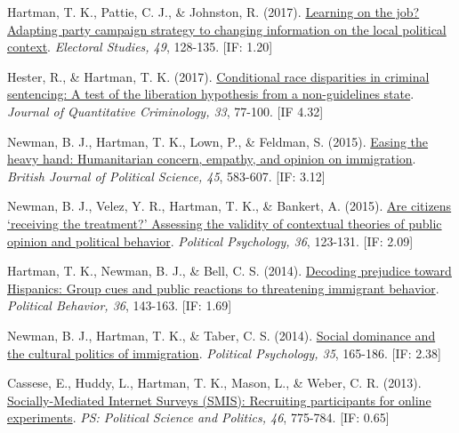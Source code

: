 \documentclass[12pt]{article}
\begin{document}
\begin{bibenum}
    \item {Hartman, T. K.}, Pattie, C. J., \& Johnston, R. (2017).
    		\href{https://10.1016/j.electstud.2017.06.005}
          {Learning on the job? Adapting party campaign strategy 
          to changing information on the local political context}. 
          \emph{Electoral Studies, 49}, 128-135. [IF: 1.20]
          
    \item Hester, R., \& {Hartman, T. K.} (2017). 
          \href{https://10.1007/s10940-016-9283-z}
          {Conditional race disparities in criminal sentencing: 
          A test of the liberation hypothesis from a non-guidelines state}. 
          \emph{Journal of Quantitative Criminology, 33}, 77-100. [IF 4.32]
          
    \item Newman, B. J., {Hartman, T. K.}, Lown, P., \& Feldman, S. (2015). 
          \href{https://10.1017/S0007123413000410}
          {Easing the heavy hand: Humanitarian concern, empathy, and 
          opinion on immigration}. 
          \emph{British Journal of Political Science, 45}, 583-607. [IF: 3.12]
           
    \item *Newman, B. J., Velez, Y. R., {Hartman, T. K.}, \& Bankert, A. (2015). 
          \href{https://10.1111/pops.12069}
          {Are citizens `receiving the treatment?' Assessing the validity 
          of contextual theories of public opinion and political behavior}. 
          \emph{Political Psychology, 36}, 123-131. [IF: 2.09]

    \item {Hartman, T. K.}, Newman, B. J., \& Bell, C. S. (2014). 
          \href{https://10.1007/s11109-013-9231-7}
          {Decoding prejudice toward Hispanics: 
			Group cues and public reactions to threatening immigrant behavior}.
          \emph{Political Behavior, 36}, 143-163. [IF: 1.69]
  
    \item *Newman, B. J., {Hartman, T. K.}, \& Taber, C. S. (2014). 
          \href{https://10.1111/pops.12047}
          {Social dominance and the cultural politics of immigration}. 
          \emph{Political Psychology, 35}, 165-186. [IF: 2.38]

    \item Cassese, E., Huddy, L., {Hartman, T. K.}, Mason, L., 
          \& Weber, C. R. (2013). 
          \href{https://10.1017/S1049096513001029}
          {Socially-Mediated Internet Surveys (SMIS): 
          Recruiting participants for online experiments}. 
          \emph{PS: Political Science and Politics, 46}, 775-784. [IF: 0.65]


\end{bibenum}
\end{document}
